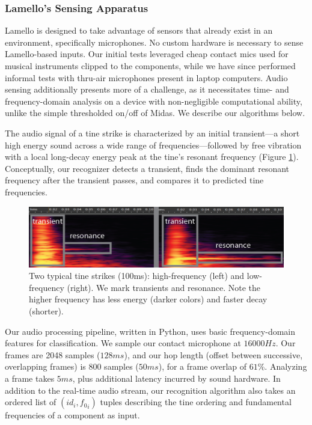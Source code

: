     \subsubsection{Lamello's Sensing Apparatus}
    
    Lamello is designed to take advantage of sensors that already exist in an environment, specifically microphones. No custom hardware is necessary to sense Lamello-based inputs. Our initial tests leveraged cheap contact mics used for musical instruments clipped to the components, while we have since performed informal tests with thru-air microphones present in laptop computers. Audio sensing additionally presents more of a challenge, as it necessitates time- and frequency-domain analysis on a device with non-negligible computational ability, unlike the simple thresholded on/off of Midas. We describe our algorithms below.

    The audio signal of a tine strike is characterized by an initial transient---a short high energy sound across a wide range of frequencies---followed by free vibration with a local long-decay energy peak at the tine's resonant frequency (Figure \ref{fig:lamello-transient}). Conceptually, our recognizer detects a transient, finds the dominant resonant frequency after the transient passes, and compares it to predicted tine frequencies.
    
    
\begin{figure}
  \centering
    \includegraphics[width=\textwidth]{figures/lamello/transient-resonance.png}
  \caption{Two typical tine strikes (100ms): high-frequency (left) and low-frequency (right).  We mark transients and resonance.  Note the higher frequency has less energy (darker colors) and faster decay (shorter).} 
  \label{fig:lamello-transient}
\end{figure}

    Our audio processing pipeline, written in Python, uses basic frequency-domain features for classification. We sample our contact microphone at $16000Hz$. Our frames are 2048 samples ($128ms$), and our hop length (offset between successive, overlapping frames) is 800 samples ($50ms$), for a frame overlap of $61$\%. Analyzing a frame takes $5ms$, plus additional latency incurred by sound hardware. In addition to the real-time audio stream, our recognition algorithm also takes an ordered list of $(id_i,{f_0}_i)$ tuples describing the tine ordering and fundamental frequencies of a component as input.

